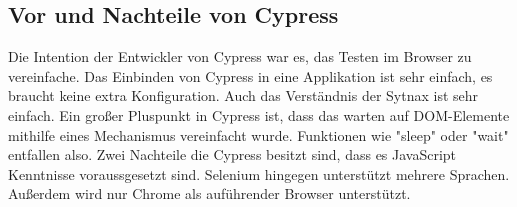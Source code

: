 \subsection{Vor und Nachteile von Cypress}

Die Intention der Entwickler von Cypress war es, das Testen im Browser zu vereinfache. Das Einbinden von Cypress in eine Applikation ist sehr einfach, es braucht keine extra Konfiguration. Auch das Verständnis der Sytnax ist sehr einfach. Ein großer Pluspunkt in Cypress ist, dass das warten auf DOM-Elemente mithilfe eines Mechanismus vereinfacht wurde. Funktionen wie "sleep" oder "wait" entfallen also. 
Zwei Nachteile die Cypress besitzt sind, dass es JavaScript Kenntnisse voraussgesetzt sind. Selenium hingegen unterstützt mehrere Sprachen. Außerdem wird nur Chrome als auführender Browser unterstützt.












